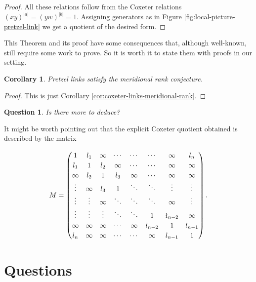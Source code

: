\documentclass{article}
\newtheorem{corollary}[theorem]{Corollary}
\newtheorem{question}[theorem]{Question}
\theoremstyle{definition}
\begin{document}
\begin{proof}
All these relations follow from the Coxeter relations $(xy)^{|a|} = (yw)^{|b|} = 1$. Assigning generators as in Figure \ref{fig:local-picture-pretzel-link} we get a quotient of the desired form.
\end{proof}

This Theorem and its proof have some consequences that, although well-known, still require some work to prove. So it is worth it to state them with proofs in our setting.

\begin{corollary}
Pretzel links satisfy the meridional rank conjecture.
\end{corollary}

\begin{proof}
This is just Corollary \ref{cor:coxeter-links-meridional-rank}.
\end{proof}

\begin{question}
Is there more to deduce?
\end{question}

It might be worth pointing out that the explicit Coxeter quotient obtained is described by the matrix

$$
\renewcommand\arraystretch{1.2}
M = \left( \begin{matrix}
1 & l_1 & \infty & \cdots & \cdots &\cdots & \infty & l_n \\
l_1 & 1 & l_2 & \infty & \cdots & \cdots & \infty & \infty \\
\infty & l_2 & 1 & l_3 & \infty &\cdots & \infty & \infty \\
\vdots & \infty  & l_3 & 1 & \ddots & \ddots & \vdots & \vdots \\
\vdots & \vdots & \infty & \ddots & \ddots & \ddots & \infty & \vdots \\
\vdots & \vdots & \vdots & \ddots &\ddots & 1 & \l_{n-2} & \infty \\
\infty & \infty & \infty & \cdots & \infty & l_{n-2} & 1 & l_{n-1} \\
l_n & \infty & \infty & \cdots & \cdots & \infty  & l_{n-1} & 1
\end{matrix} \right).$$

\newpage

\section{Questions}



\end{document}
